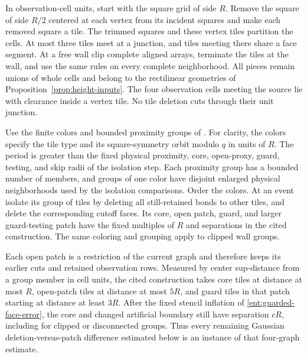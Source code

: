 In observation-cell units, start with the square grid of side \(R\).
Remove the square of side \(R/2\) centered at each vertex from its
incident squares and make each removed square a tile.  The trimmed
squares and these vertex tiles partition the cells.  At most three
tiles meet at a junction, and tiles meeting there share a face
segment.  At a free wall clip complete aligned arrays, terminate the
tiles at the wall, and use the same rules on every complete
neighborhood.  All pieces remain unions of whole cells and belong
to the rectilinear geometries of Proposition~\ref{prop:height-inputs}.
The four observation cells meeting the source lie with clearance
inside a vertex tile.  No tile deletion cuts through their unit
junction.

Use the finite colors and bounded proximity groups of
\cite[Section~9, \emph{A finite, covariant isolation expansion}]{B}.
For clarity, the colors specify the tile type and its square-symmetry
orbit modulo \(q\) in units of \(R\).  The period is greater than
the fixed physical proximity, core, open-proxy, guard, testing, and
skip radii of the isolation step.  Each proximity
group has a bounded number of members, and groups of one color have
disjoint enlarged physical neighborhoods used by the isolation
comparisons.  Order the colors.  At an event isolate its
group of tiles by deleting all still-retained bonds to other tiles,
and delete the corresponding cutoff faces.  Its core, open patch,
guard, and larger guard-testing patch have the fixed multiples of
\(R\) and separations in the cited construction.  The same coloring
and grouping apply to clipped wall groups.

Each open patch is a restriction of the current graph and therefore
keeps its earlier cuts and retained observation rows.  Measured by
center sup-distance from a group member in cell units, the cited
construction takes core tiles at distance at most \(R\), open-patch
tiles at distance at most \(5R\), and guard tiles in that patch
starting at distance at least \(3R\).  After the fixed stencil inflation of
\eqref{ent:guarded-face-error}, the core and changed artificial
boundary still have separation \(cR\), including for clipped or
disconnected groups.  Thus every remaining Gaussian
deletion-versus-patch difference estimated below is an instance of
that four-graph estimate.


